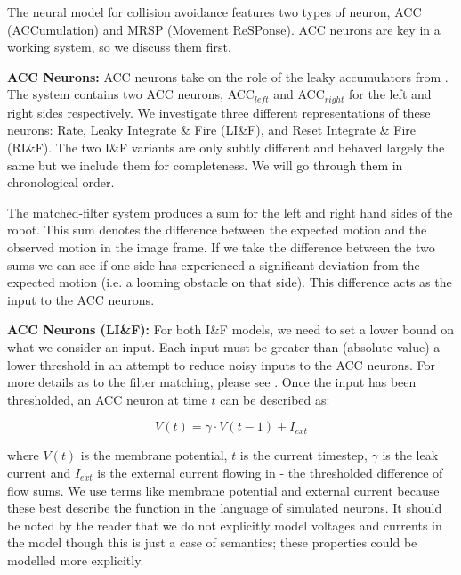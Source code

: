 \documentclass[a4paper,11pt,twoside,openright]{article}
\begin{document}
The neural model for collision avoidance features two types of neuron, ACC
(ACCumulation) and MRSP (Movement ReSPonse). ACC neurons are key in a working
system, so we discuss them first.
\newline\par

\textbf{ACC Neurons:}
ACC neurons take on the role of the leaky accumulators from \cite{Mitchell2018,
  Stewart2010}. The system contains two ACC neurons, ACC$_{left}$ and
ACC$_{right}$ for the left and right sides respectively. We investigate three
different representations of these neurons: Rate, Leaky Integrate \& Fire
(LI\&F), and Reset Integrate \& Fire (RI\&F). The two I\&F variants are only
subtly different and behaved largely the same but we include them for
completeness. We will go through them in chronological order.
\newline\par

The matched-filter system produces a sum for the left and right hand sides of the
robot. This sum denotes the difference between the expected motion and the
observed motion in the image frame. If we take the difference between the two
sums we can see if one side has experienced a significant deviation from the
expected motion (i.e. a looming obstacle on that side). This difference acts
as the input to the ACC neurons.
\newline\par

\textbf{ACC Neurons (LI\&F):}
For both I\&F models, we need to set a lower bound on what we consider an
input.  Each input must be greater than (absolute value) a lower threshold in an
attempt to reduce noisy inputs to the ACC neurons. For more details as to the
filter matching, please see \cite{Mitchell2018}. Once the input has been
thresholded, an ACC neuron at time $t$ can be described as:

\begin{equation}
  V(t) = \gamma \cdot V(t-1) + I_{ext}
\end{equation}

where $V(t)$ is the membrane potential, $t$ is the current timestep,
$\gamma$ is the leak current and $I_{ext}$ is the external current flowing in
- the thresholded difference of flow sums.
We use terms like membrane potential and external current because these best
describe the function in the language of simulated neurons. It should be noted
by the reader that we do not explicitly model voltages and currents in the model
though this is just a case of semantics; these properties could be modelled more
explicitly.
\newline\par
\end{document}
